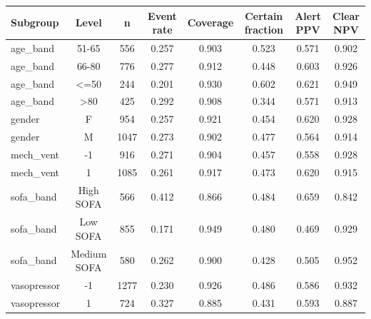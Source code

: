 \begin{tabular}{@{}lccccccc@{}}
\toprule
Subgroup & Level & n & Event rate & Coverage & Certain fraction & Alert PPV & Clear NPV\\
\midrule
age\_band & 51-65 & 556 & 0.257 & 0.903 & 0.523 & 0.571 & 0.902\\
age\_band & 66-80 & 776 & 0.277 & 0.912 & 0.448 & 0.603 & 0.926\\
age\_band & <=50 & 244 & 0.201 & 0.930 & 0.602 & 0.621 & 0.949\\
age\_band & >80 & 425 & 0.292 & 0.908 & 0.344 & 0.571 & 0.913\\
gender & F & 954 & 0.257 & 0.921 & 0.454 & 0.620 & 0.928\\
gender & M & 1047 & 0.273 & 0.902 & 0.477 & 0.564 & 0.914\\
mech\_vent & -1 & 916 & 0.271 & 0.904 & 0.457 & 0.558 & 0.928\\
mech\_vent & 1 & 1085 & 0.261 & 0.917 & 0.473 & 0.620 & 0.915\\
sofa\_band & High SOFA & 566 & 0.412 & 0.866 & 0.484 & 0.659 & 0.842\\
sofa\_band & Low SOFA & 855 & 0.171 & 0.949 & 0.480 & 0.469 & 0.929\\
sofa\_band & Medium SOFA & 580 & 0.262 & 0.900 & 0.428 & 0.505 & 0.952\\
vasopressor & -1 & 1277 & 0.230 & 0.926 & 0.486 & 0.586 & 0.932\\
vasopressor & 1 & 724 & 0.327 & 0.885 & 0.431 & 0.593 & 0.887\\
\bottomrule
\end{tabular}
